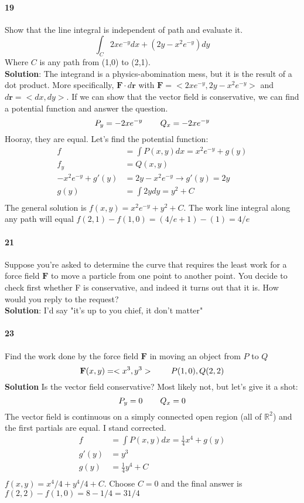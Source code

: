\documentclass{article}
\begin{document}
    \paragraph{19} Show that the line integral is independent of path and evaluate it.
    \[\int_C 2xe^{-y}dx + (2y-x^{2}e^{-y})dy\]
    Where $C$ is any path from (1,0) to (2,1).\\
    \textbf{Solution}: The integrand is a physics-abomination mess, but it is the result of a dot product. More specifically,
    $\mathbf{F} \cdot d\mathbf{r}$ with $\mathbf{F}=<2xe^{-y}, 2y-x^{2}e^{-y}>$ and $d\mathbf{r} = <dx, dy>$. If we can show that the
    vector field is conservative, we can find a potential function and answer the question.
    \[P_y = -2xe^{-y} \hspace{0.3in} Q_x = -2xe^{-y}\]
    Hooray, they are equal. Let's find the potential function:
    \begin{align*}
        f &= \int P(x,y) dx = x^{2}e^{-y} + g(y) \\
        f_y &= Q(x,y) \\
        -x^{2}e^{-y} + g'(y) &= 2y-x^{2}e^{-y} \rightarrow g'(y) = 2y \\
        g(y) &= \int 2y dy = y^2 + C \\
    \end{align*}
    The general solution is $f(x,y) = x^{2}e^{-y} + y^2 + C$.
    The work line integral along any path will equal $f(2,1)-f(1,0)=(4/e+1)-(1)=4/e$

    \paragraph{21} Suppose you're asked to determine the curve that requires
    the least work for a force field $\mathbf{F}$ to move a particle from one point to another point.
    You decide to check first whether F is conservative, and indeed it turns out that it is.
    How would you reply to the request?\\
    \textbf{Solution}: I'd say "it's up to you chief, it don't matter"

    \paragraph{23} Find the work done by the force field $\mathbf{F}$ in moving an object from $P$ to $Q$
    \[\mathbf{F}(x,y) = <x^3, y^3> \hspace{0.3in}P(1,0),Q(2,2)\]
    \textbf{Solution} Is the vector field conservative? Most likely not, but let's give it a shot:
    \[P_y = 0 \hspace{0.3in} Q_x = 0\]
    The vector field is continuous on a simply connected open region (all of $\mathbb{R}^2$) and the first partials are equal.
    I stand corrected.
    \begin{align*}
        f &= \int P(x,y)dx = \frac{1}{4}x^4 + g(y)\\
        g'(y) &= y^3 \\
        g(y) &= \frac{1}{4}y^4 + C\\
    \end{align*}
    $f(x,y) = x^4/4 + y^4/4 + C$. Choose $C=0$ and the final answer is $f(2,2)-f(1,0)=8-1/4=31/4$
\end{document}
